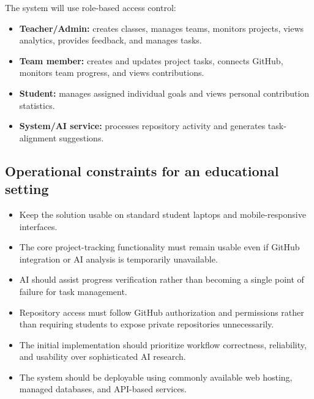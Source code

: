 \documentclass[11pt,a4paper]{article}
\begin{document}
The system will use role-based access control:

\begin{itemize}[leftmargin=0.7cm]

    \item \textbf{Teacher/Admin:} creates classes, manages teams, monitors projects, views analytics, provides feedback, and manages tasks.

    \item \textbf{Team member:} creates and updates project tasks, connects GitHub, monitors team progress, and views contributions.

    \item \textbf{Student:} manages assigned individual goals and views personal contribution statistics.

    \item \textbf{System/AI service:} processes repository activity and generates task-alignment suggestions.

\end{itemize}


\subsection{Operational constraints for an educational setting}

\begin{itemize}[leftmargin=0.7cm]

    \item Keep the solution usable on standard student laptops and mobile-responsive interfaces.

    \item The core project-tracking functionality must remain usable even if GitHub integration or AI analysis is temporarily unavailable.

    \item AI should assist progress verification rather than becoming a single point of failure for task management.

    \item Repository access must follow GitHub authorization and permissions rather than requiring students to expose private repositories unnecessarily.

    \item The initial implementation should prioritize workflow correctness, reliability, and usability over sophisticated AI research.

    \item The system should be deployable using commonly available web hosting, managed databases, and API-based services.

\end{itemize}
\end{document}
